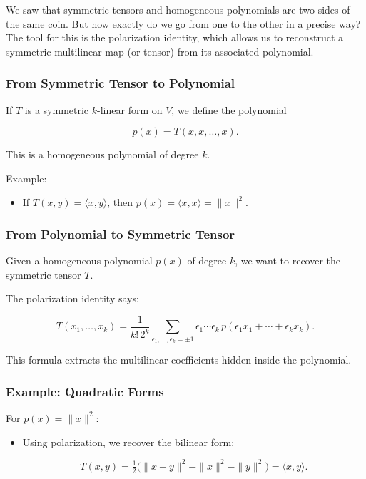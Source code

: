 \documentclass[
  letterpaper,
  DIV=11,
  numbers=noendperiod]{scrreprt}
\providecommand{\tightlist}{%
  \setlength{\itemsep}{0pt}\setlength{\parskip}{0pt}}
\begin{document}
We saw that symmetric tensors and homogeneous polynomials are two sides
of the same coin. But how exactly do we go from one to the other in a
precise way? The tool for this is the polarization identity, which
allows us to reconstruct a symmetric multilinear map (or tensor) from
its associated polynomial.

\subsubsection{From Symmetric Tensor to
Polynomial}\label{from-symmetric-tensor-to-polynomial}

If \(T\) is a symmetric \(k\)-linear form on \(V\), we define the
polynomial

\[
p(x) = T(x,x,\dots,x).
\]

This is a homogeneous polynomial of degree \(k\).

Example:

\begin{itemize}
\tightlist
\item
  If \(T(x,y) = \langle x,y \rangle\), then
  \(p(x) = \langle x,x \rangle = \|x\|^2\).
\end{itemize}

\subsubsection{From Polynomial to Symmetric
Tensor}\label{from-polynomial-to-symmetric-tensor}

Given a homogeneous polynomial \(p(x)\) of degree \(k\), we want to
recover the symmetric tensor \(T\).

The polarization identity says:

\[
T(x_1, \dots, x_k) = \frac{1}{k! \, 2^k} \sum_{\epsilon_1,\dots,\epsilon_k = \pm 1} \epsilon_1 \cdots \epsilon_k \, p(\epsilon_1 x_1 + \cdots + \epsilon_k x_k).
\]

This formula extracts the multilinear coefficients hidden inside the
polynomial.

\subsubsection{Example: Quadratic Forms}\label{example-quadratic-forms}

For \(p(x) = \|x\|^2\):

\begin{itemize}
\item
  Using polarization, we recover the bilinear form:

  \[
  T(x,y) = \tfrac{1}{2} \big( \|x+y\|^2 - \|x\|^2 - \|y\|^2 \big) = \langle x,y \rangle.
  \]
\end{itemize}
\end{document}
